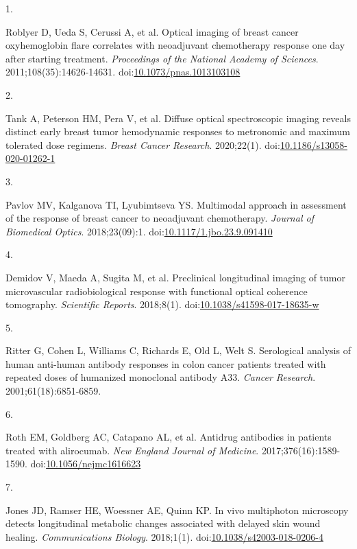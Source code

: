 \documentclass[
]{article}
\newlength{\cslhangindent}
\newlength{\csllabelwidth}
\newlength{\cslentryspacingunit} %
\newenvironment{CSLReferences}[2] %
 {%
  \setlength{\parindent}{0pt}
  \ifodd #1
  \let\oldpar\par
  \def\par{\hangindent=\cslhangindent\oldpar}
  \fi
  \setlength{\parskip}{#2\cslentryspacingunit}
 }%
 {}
\newcommand{\CSLLeftMargin}[1]{\parbox[t]{\csllabelwidth}{#1}}
\newcommand{\CSLRightInline}[1]{\parbox[t]{\linewidth - \csllabelwidth}{#1}\break}
\begin{document}
\hypertarget{refs}{}
\begin{CSLReferences}{0}{0}
\leavevmode{}%
\CSLLeftMargin{1. }
\CSLRightInline{Roblyer D, Ueda S, Cerussi A, et al. Optical imaging of breast cancer oxyhemoglobin flare correlates with neoadjuvant chemotherapy response one day after starting treatment. \emph{Proceedings of the National Academy of Sciences}. 2011;108(35):14626-14631. doi:\href{https://doi.org/10.1073/pnas.1013103108}{10.1073/pnas.1013103108}}

\leavevmode{}%
\CSLLeftMargin{2. }
\CSLRightInline{Tank A, Peterson HM, Pera V, et al. Diffuse optical spectroscopic imaging reveals distinct early breast tumor hemodynamic responses to metronomic and maximum tolerated dose regimens. \emph{Breast Cancer Research}. 2020;22(1). doi:\href{https://doi.org/10.1186/s13058-020-01262-1}{10.1186/s13058-020-01262-1}}

\leavevmode{}%
\CSLLeftMargin{3. }
\CSLRightInline{Pavlov MV, Kalganova TI, Lyubimtseva YS. Multimodal approach in assessment of the response of breast cancer to neoadjuvant chemotherapy. \emph{Journal of Biomedical Optics}. 2018;23(09):1. doi:\href{https://doi.org/10.1117/1.jbo.23.9.091410}{10.1117/1.jbo.23.9.091410}}

\leavevmode{}%
\CSLLeftMargin{4. }
\CSLRightInline{Demidov V, Maeda A, Sugita M, et al. Preclinical longitudinal imaging of tumor microvascular radiobiological response with functional optical coherence tomography. \emph{Scientific Reports}. 2018;8(1). doi:\href{https://doi.org/10.1038/s41598-017-18635-w}{10.1038/s41598-017-18635-w}}

\leavevmode{}%
\CSLLeftMargin{5. }
\CSLRightInline{Ritter G, Cohen L, Williams C, Richards E, Old L, Welt S. {Serological analysis of human anti-human antibody responses in colon cancer patients treated with repeated doses of humanized monoclonal antibody A33}. \emph{{Cancer Research}}. 2001;{61}({18}):6851-6859.}

\leavevmode{}%
\CSLLeftMargin{6. }
\CSLRightInline{Roth EM, Goldberg AC, Catapano AL, et al. Antidrug antibodies in patients treated with alirocumab. \emph{New England Journal of Medicine}. 2017;376(16):1589-1590. doi:\href{https://doi.org/10.1056/nejmc1616623}{10.1056/nejmc1616623}}

\leavevmode{}%
\CSLLeftMargin{7. }
\CSLRightInline{Jones JD, Ramser HE, Woessner AE, Quinn KP. In vivo multiphoton microscopy detects longitudinal metabolic changes associated with delayed skin wound healing. \emph{Communications Biology}. 2018;1(1). doi:\href{https://doi.org/10.1038/s42003-018-0206-4}{10.1038/s42003-018-0206-4}}


\end{CSLReferences}
\end{document}
